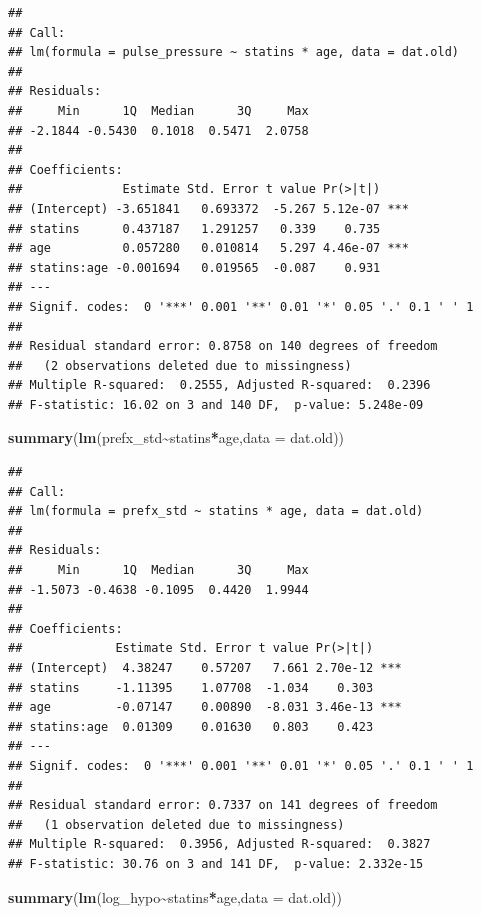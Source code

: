 \documentclass[
]{article}
\newenvironment{Shaded}{\begin{snugshade}}{\end{snugshade}}
\newcommand{\AttributeTok}[1]{\textcolor[rgb]{0.13,0.29,0.53}{#1}}
\newcommand{\FunctionTok}[1]{\textcolor[rgb]{0.13,0.29,0.53}{\textbf{#1}}}
\newcommand{\NormalTok}[1]{#1}
\newcommand{\SpecialCharTok}[1]{\textcolor[rgb]{0.81,0.36,0.00}{\textbf{#1}}}
\begin{document}
\begin{verbatim}
## 
## Call:
## lm(formula = pulse_pressure ~ statins * age, data = dat.old)
## 
## Residuals:
##     Min      1Q  Median      3Q     Max 
## -2.1844 -0.5430  0.1018  0.5471  2.0758 
## 
## Coefficients:
##              Estimate Std. Error t value Pr(>|t|)    
## (Intercept) -3.651841   0.693372  -5.267 5.12e-07 ***
## statins      0.437187   1.291257   0.339    0.735    
## age          0.057280   0.010814   5.297 4.46e-07 ***
## statins:age -0.001694   0.019565  -0.087    0.931    
## ---
## Signif. codes:  0 '***' 0.001 '**' 0.01 '*' 0.05 '.' 0.1 ' ' 1
## 
## Residual standard error: 0.8758 on 140 degrees of freedom
##   (2 observations deleted due to missingness)
## Multiple R-squared:  0.2555, Adjusted R-squared:  0.2396 
## F-statistic: 16.02 on 3 and 140 DF,  p-value: 5.248e-09
\end{verbatim}

\begin{Shaded}
\begin{Highlighting}[]
\FunctionTok{summary}\NormalTok{(}\FunctionTok{lm}\NormalTok{(prefx\_std}\SpecialCharTok{\textasciitilde{}}\NormalTok{statins}\SpecialCharTok{*}\NormalTok{age,}\AttributeTok{data =}\NormalTok{ dat.old))}
\end{Highlighting}
\end{Shaded}

\begin{verbatim}
## 
## Call:
## lm(formula = prefx_std ~ statins * age, data = dat.old)
## 
## Residuals:
##     Min      1Q  Median      3Q     Max 
## -1.5073 -0.4638 -0.1095  0.4420  1.9944 
## 
## Coefficients:
##             Estimate Std. Error t value Pr(>|t|)    
## (Intercept)  4.38247    0.57207   7.661 2.70e-12 ***
## statins     -1.11395    1.07708  -1.034    0.303    
## age         -0.07147    0.00890  -8.031 3.46e-13 ***
## statins:age  0.01309    0.01630   0.803    0.423    
## ---
## Signif. codes:  0 '***' 0.001 '**' 0.01 '*' 0.05 '.' 0.1 ' ' 1
## 
## Residual standard error: 0.7337 on 141 degrees of freedom
##   (1 observation deleted due to missingness)
## Multiple R-squared:  0.3956, Adjusted R-squared:  0.3827 
## F-statistic: 30.76 on 3 and 141 DF,  p-value: 2.332e-15
\end{verbatim}

\begin{Shaded}
\begin{Highlighting}[]
\FunctionTok{summary}\NormalTok{(}\FunctionTok{lm}\NormalTok{(log\_hypo}\SpecialCharTok{\textasciitilde{}}\NormalTok{statins}\SpecialCharTok{*}\NormalTok{age,}\AttributeTok{data =}\NormalTok{ dat.old))}
\end{Highlighting}
\end{Shaded}
\end{document}
